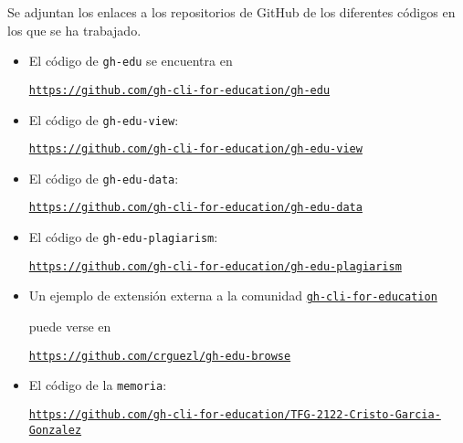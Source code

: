Se adjuntan los enlaces a los repositorios de GitHub de los diferentes códigos en los que se ha trabajado.

\begin{itemize}
  \item 
  El código de \verb|gh-edu| se encuentra en

  \href{https://github.com/gh-cli-for-education/gh-edu}{{\tt https://github.com/gh-cli-for-education/gh-edu}}
  
  \item 
  El código de \verb|gh-edu-view|: 
  
  \href{https://github.com/gh-cli-for-education/gh-edu-view}{{\tt https://github.com/gh-cli-for-education/gh-edu-view}}
  
  
  \item 
  El código de \verb|gh-edu-data|:
  
  \href{https://github.com/gh-cli-for-education/gh-edu-data}{{\tt https://github.com/gh-cli-for-education/gh-edu-data}}
  
  \item 
  El código de \verb|gh-edu-plagiarism|:
  
  \href{https://github.com/gh-cli-for-education/gh-edu-plagiarism}{{\tt https://github.com/gh-cli-for-education/gh-edu-plagiarism}}
  
  \item Un ejemplo de extensión externa a la comunidad   \href{https://github.com/gh-cli-for-education/}{{\tt gh-cli-for-education}}
  
  puede verse en 
  
  \href{https://github.com/crguezl/gh-edu-browse}{{\tt https://github.com/crguezl/gh-edu-browse}}

  \item 
  El código de la \verb|memoria|:

  \href{https://github.com/gh-cli-for-education/TFG-2122-Cristo-Garcia-Gonzalez}{{\tt https://github.com/gh-cli-for-education/TFG-2122-Cristo-Garcia-Gonzalez}}
  
  
\end{itemize}